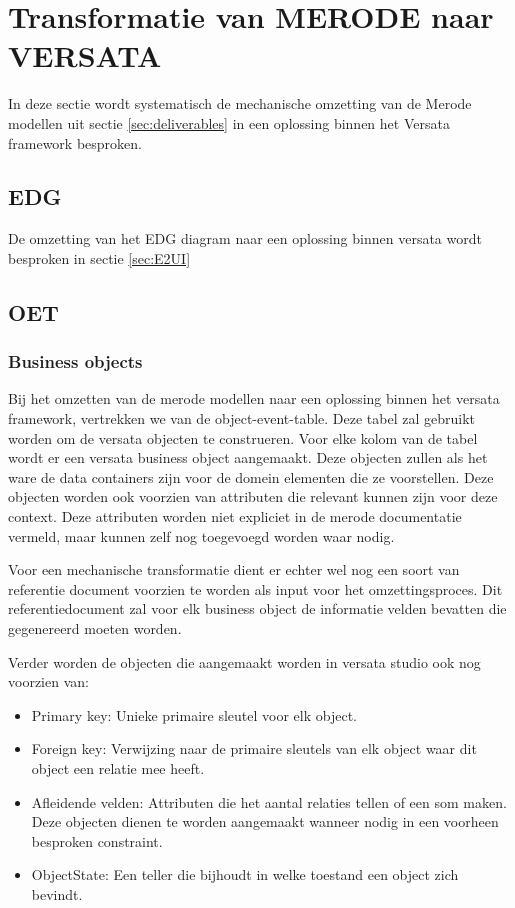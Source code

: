 \section{Transformatie van MERODE naar VERSATA}
\label{sec:mech_transform}
In deze sectie wordt systematisch de mechanische omzetting van de Merode modellen uit sectie \ref{sec:deliverables} in een oplossing binnen het Versata framework besproken.
\subsection{EDG}
De omzetting van het EDG diagram naar een oplossing binnen versata wordt besproken in sectie \ref{sec:E2UI}

\subsection{OET}
\label{sec:OET}
\subsubsection{Business objects}
Bij het omzetten van de merode modellen naar een oplossing binnen het versata framework, vertrekken we van de object-event-table. Deze tabel zal gebruikt worden om de versata objecten te construeren.
Voor elke kolom van de tabel wordt er een versata business object aangemaakt. 
Deze objecten zullen als het ware de data containers zijn voor de domein elementen die ze voorstellen. Deze objecten worden ook voorzien van attributen die relevant kunnen zijn voor deze context. Deze attributen worden niet expliciet in de merode documentatie vermeld, maar kunnen zelf nog toegevoegd worden waar nodig.

Voor een mechanische transformatie dient er echter wel nog een soort van referentie document voorzien te worden als input voor het omzettingsproces. 
Dit referentiedocument zal voor elk business object de informatie velden bevatten die gegenereerd moeten worden.

Verder worden de objecten die aangemaakt worden in versata studio ook nog voorzien van: 
\begin{itemize}
	\item Primary key: Unieke primaire sleutel voor elk object.
	\item Foreign key: Verwijzing naar de primaire sleutels van elk object waar dit object een relatie mee heeft.
	\item Afleidende velden: Attributen die het aantal relaties tellen of een som maken. Deze objecten dienen te worden aangemaakt wanneer nodig in een voorheen besproken constraint.
	\item ObjectState: Een teller die bijhoudt in welke toestand een object zich bevindt.
\end{itemize}
